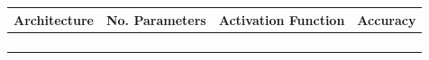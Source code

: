 \documentclass[11pt,oneside,openany,a4paper,english, report, goldenblock
]{usthesis}
\begin{document}
\begin{tabular}[h]{|c|c|c|c|}

	Architecture & No. Parameters & Activation Function & Accuracy \\ 
	\hline
	&  &  &  \\ 
	 
	&  &  &  \\ 
	 
	&  &  &  \\ 
	 
	&  &  &  \\ 
	\hline 
\end{tabular} 



\end{document}
